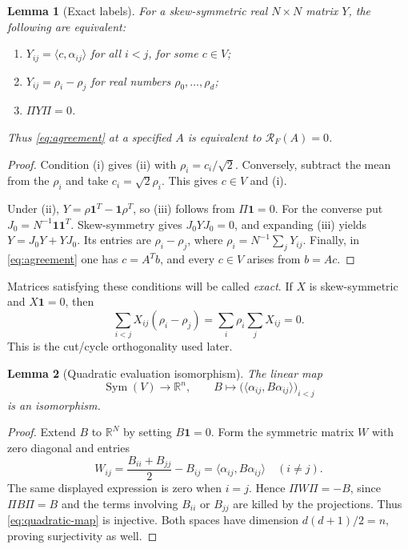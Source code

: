 \documentclass[11pt,reqno]{amsart}
\newtheorem{lemma}[lemma]{Lemma}
\theoremstyle{definition}
\theoremstyle{remark}
\numberwithin{equation}{section}
\newcommand{\R}{\mathbb R}
\newcommand{\one}{\mathbf 1}
\newcommand{\ip}[2]{\langle #1,#2\rangle}
\DeclareMathOperator{\Sym}{Sym}
\begin{document}
\begin{lemma}[Exact labels]\label{lem:exact}
For a skew-symmetric real $N\times N$ matrix $Y$, the following are
equivalent:
\begin{enumerate}[label=(\roman*)]
 \item $Y_{ij}=\ip{c}{\alpha_{ij}}$ for all $i<j$, for some $c\in V$;
 \item $Y_{ij}=\rho_i-\rho_j$ for real numbers $\rho_0,\ldots,\rho_d$;
 \item $\Pi Y\Pi=0$.
\end{enumerate}
Thus \eqref{eq:agreement} at a specified $A$ is equivalent to
$\mathcal R_F(A)=0$.
\end{lemma}
\begin{proof}
Condition (i) gives (ii) with $\rho_i=c_i/\sqrt2$. Conversely, subtract
the mean from the $\rho_i$ and take $c_i=\sqrt2\rho_i$. This gives
$c\in V$ and (i).

Under (ii), $Y=\rho\one^T-\one\rho^T$, so (iii) follows from
$\Pi\one=0$. For the converse put $J_0=N^{-1}\one\one^T$.
Skew-symmetry gives $J_0YJ_0=0$, and expanding (iii) yields
$Y=J_0Y+YJ_0$. Its entries are $\rho_i-\rho_j$, where
$\rho_i=N^{-1}\sum_jY_{ij}$.
Finally, in \eqref{eq:agreement} one has $c=A^Tb$, and every $c\in V$
arises from $b=Ac$.
\end{proof}

Matrices satisfying these conditions will be called \emph{exact}.
If $X$ is skew-symmetric and $X\one=0$, then
\begin{equation}\label{eq:cycle}
 \sum_{i<j}X_{ij}(\rho_i-\rho_j)
 =\sum_i\rho_i\sum_jX_{ij}=0.
\end{equation}
This is the cut/cycle orthogonality used later.

\begin{lemma}[Quadratic evaluation isomorphism]\label{lem:quadratic}
The linear map
\begin{equation}\label{eq:quadratic-map}
 \Sym(V)\longrightarrow\R^n,\qquad
 B\longmapsto\bigl(\ip{\alpha_{ij}}{B\alpha_{ij}}\bigr)_{i<j}
\end{equation}
is an isomorphism.
\end{lemma}
\begin{proof}
Extend $B$ to $\R^N$ by setting $B\one=0$. Form the symmetric matrix
$W$ with zero diagonal and entries
\[
 W_{ij}=\frac{B_{ii}+B_{jj}}2-B_{ij}
       =\ip{\alpha_{ij}}{B\alpha_{ij}}\quad(i\ne j).
\]
The same displayed expression is zero when $i=j$. Hence
$\Pi W\Pi=-B$, since $\Pi B\Pi=B$ and the terms involving $B_{ii}$
or $B_{jj}$ are killed by the projections. Thus \eqref{eq:quadratic-map}
is injective. Both spaces have dimension $d(d+1)/2=n$, proving
surjectivity as well.
\end{proof}
\end{document}
